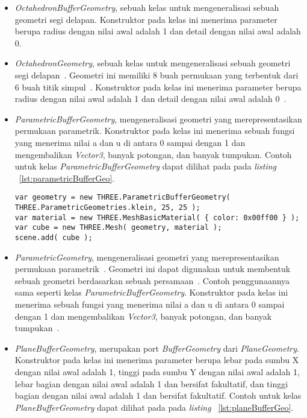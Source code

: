 \begin{itemize}
\begin{itemize}
		\item {\it OctahedronBufferGeometry}, sebuah kelas untuk mengeneralisasi sebuah geometri segi delapan. Konstruktor pada kelas ini menerima parameter berupa radius dengan nilai awal adalah 1 dan detail dengan nilai awal adalah 0.
		\item {\it OctahedronGeometry}, sebuah kelas untuk mengeneralisasi sebuah geometri segi delapan~\cite{threejs}. Geometri ini memiliki 8 buah permukaan yang terbentuk dari 6 buah titik simpul~\cite{learningThreejs}. Konstruktor pada kelas ini menerima parameter berupa radius dengan nilai awal adalah 1 dan detail dengan nilai awal adalah 0~\cite{threejs}.
		\item {\it ParametricBufferGeometry}, mengeneralisasi geometri yang merepresentasikan permukaan parametrik. Konstruktor pada kelas ini menerima sebuah fungsi yang menerima nilai a dan u di antara 0 sampai dengan 1 dan mengembalikan {\it Vector3}, banyak potongan, dan banyak tumpukan. Contoh untuk kelas {\it ParametricBufferGeometry} dapat dilihat pada pada {\it listing} ~\ref{lst:parametricBufferGeo}.
\begin{lstlisting}[caption={Contoh penggunaan kelas {\it ParametricBufferGeometry}.}, label={lst:parametricBufferGeo},captionpos=b]
var geometry = new THREE.ParametricBufferGeometry( 
THREE.ParametricGeometries.klein, 25, 25 );
var material = new THREE.MeshBasicMaterial( { color: 0x00ff00 } );
var cube = new THREE.Mesh( geometry, material );
scene.add( cube );
\end{lstlisting}
		\item {\it ParametricGeometry}, mengeneralisasi geometri yang merepresentasikan permukaan parametrik~\cite{threejs}. Geometri ini dapat digunakan untuk membentuk sebuah geometri berdasarkan sebuah persamaan~\cite{learningThreejs}. Contoh penggunaannya sama seperti kelas {\it ParametricBufferGeometry}. Konstruktor pada kelas ini menerima sebuah fungsi yang menerima nilai a dan u di antara 0 sampai dengan 1 dan mengembalikan {\it Vector3}, banyak potongan, dan banyak tumpukan~\cite{threejs}.
		\item {\it PlaneBufferGeometry}, merupakan port {\it BufferGeometry} dari {\it PlaneGeometry}. Konstruktor pada kelas ini menerima parameter berupa lebar pada sumbu X dengan nilai awal adalah 1, tinggi pada sumbu Y dengan nilai awal adalah 1, lebar bagian dengan nilai awal adalah 1 dan bersifat fakultatif, dan tinggi bagian dengan nilai awal adalah 1 dan bersifat fakultatif. Contoh untuk kelas {\it PlaneBufferGeometry} dapat dilihat pada pada {\it listing} ~\ref{lst:planeBufferGeo}.
	

\end{itemize}
\end{itemize}
